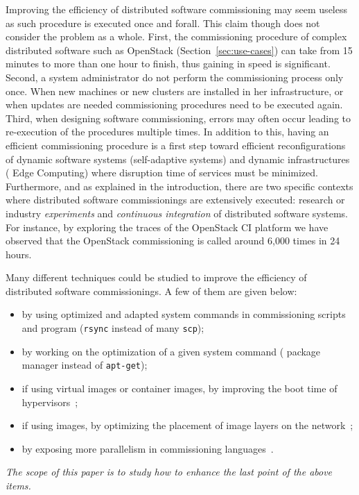 Improving the efficiency of distributed software commissioning may
seem useless as such procedure is executed once and forall. This claim
though does not consider the problem as a whole.
%
First, the commissioning procedure of complex distributed software
such as OpenStack (Section~\ref{sec:use-cases}) can take from 15
minutes to more than one hour to finish, thus gaining in speed is
significant. Second, a system administrator do not perform the
commissioning process only once. When new machines or new clusters are
installed in her infrastructure, or when updates are needed
commissioning procedures need to be executed again. Third, when
designing software commissioning, errors may often occur leading to
re-execution of the procedures multiple times.
In addition to this, having an efficient commissioning procedure is a
first step toward efficient reconfigurations of dynamic software
systems (\eg self-adaptive systems) and dynamic infrastructures (\eg
Edge Computing) where disruption time of services must be minimized.
Furthermore, and as explained in the introduction, there are two
specific contexts where distributed software commissionings are
extensively executed: research or industry \emph{experiments} and
\emph{continuous integration} of distributed software systems. For
instance, by exploring the traces of the OpenStack CI platform we have
observed that the OpenStack commissioning is called around 6,000 times
in 24 hours.

Many different techniques could be studied to improve the efficiency
of distributed software commissionings. A few of them are given below:
\begin{itemize}
\item by using optimized and adapted system commands in commissioning
  scripts and program (\eg \texttt{rsync} instead of many
  \texttt{scp});
\item by working on the optimization of a given system command (\eg
  \nist package manager instead of \texttt{apt-get});
\item if using virtual images or container images, by improving the
  boot time of hypervisors~\cite{yolo};
\item if using \docker images, by optimizing the placement of image
  layers on the network~\cite{Nitro};
\item by exposing more parallelism in commissioning
  languages~\cite{madeus, aeolus}.
\end{itemize}

\emph{The scope of this paper is to study how to enhance the last point of
the above items.}